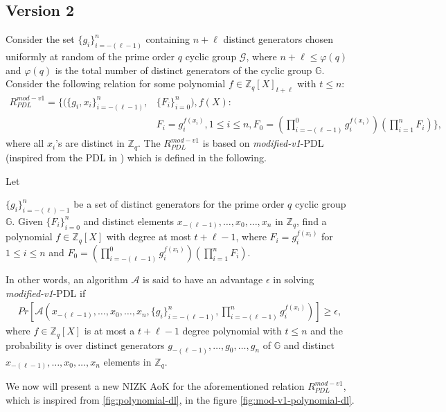 \subsection{Version 2}
Consider the set $\{g_i\}_{i=-(\ell-1)}^n$ containing $n+\ell$ distinct generators chosen uniformly at random of 
the prime order $q$ cyclic group $\mathcal{G}$, where $n+\ell\leq\varphi(q)$ and $\varphi(q)$ is 
the total number of distinct generators of the cyclic group $\mathbb{G}$. Consider the following relation for 
some polynomial $f\in\mathbb{Z}_q[X]_{t+\ell}$ with $t\leq n$:
\begin{align}\label{eq:relation_mod_v1_PDL}
  R_{PDL}^{mod-v1} = \{(\{g_i,x_i\}_{i=-(\ell-1)}^n,&\{F_i\}_{i=0}^n),f(X) :\nonumber\\
   &F_i=g_i^{f(x_i)}, 1\leq i\leq n, F_0=(\prod_{i=-(\ell-1)}^{0}g_i^{f(x_i)})(\prod_{i=1}^{n}F_i)\},
\end{align}
where all $x_i$'s are distinct in $\mathbb{Z}_q$. The $R_{PDL}^{mod-v1}$ is based on \textit{modified-v1}-PDL (inspired from the PDL in \cite{cryptoeprint:2023/1669}) 
which is defined in the following.

\begin{definition}
  Let\par 
  $\{g_i\}_{i=-(\ell)-1}^n$ be a set of distinct generators for the prime order $q$ cyclic 
  group $\mathbb{G}$. Given $\{F_i\}_{i=0}^n$ and distinct elements $x_{-(\ell-1)},\dots,x_0,\dots,x_n$ in 
  $\mathbb{Z}_q$, find a polynomial $f\in\mathbb{Z}_q[X]$ with degree at most $t+\ell-1$, where 
  $F_i=g_i^{f(x_i)}$ for $1\leq i\leq n$ and $F_0=(\prod_{i=-(\ell-1)}^{0}g_i^{f(x_i)})(\prod_{i=1}^{n}F_i)$.\par

  In other words, an algorithm $\mathcal{A}$ is said to have an advantage $\epsilon$ in solving \textit{modified-v1}-PDL if 
  \begin{align*}
    Pr[\mathcal{A}(x_{-(\ell-1)},\dots,x_0,\dots,x_n,\{g_i\}_{i=-(\ell-1)}^n,\prod_{i=-(\ell-1)}^{n}g_i^{f(x_i)})]\geq\epsilon,
  \end{align*}
  where $f\in\mathbb{Z}_q[X]$ is at most a $t+\ell-1$ degree polynomial with $t\leq n$ and the probability is over 
  distinct generators $g_{-(\ell-1)},\dots,g_0,\dots,g_n$ of $\mathbb{G}$ and distinct $x_{-(\ell-1)},\dots,x_0,\dots,x_n$ 
  elements in $\mathbb{Z}_q$.
\end{definition}

We now will present a new NIZK AoK for the aforementioned relation $R_{PDL}^{mod-v1}$, which is inspired from \ref{fig:polynomial-dl}, 
in the figure \ref{fig:mod-v1-polynomial-dl}.

